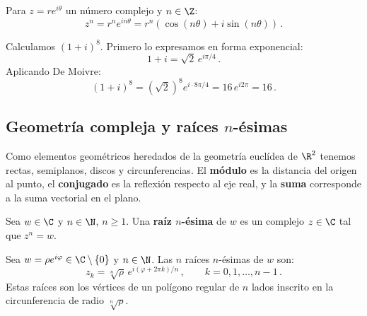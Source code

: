 \begin{theo}
  Para $z=re^{i\theta}$ un número complejo y $n \in \Z$:
  \begin{equation}
    \label{eq:formula-moivre}
    z^n = r^n e^{in\theta} = r^n(\cos(n\theta) + i\sin(n\theta))\,.
  \end{equation}
\end{theo}

\begin{eje}
  Calculamos $(1+i)^8$. Primero lo expresamos en forma exponencial:
  \[
    1+i = \sqrt{2}\,e^{i\pi/4}\,.
  \]
  Aplicando De Moivre:
  \[
    (1+i)^8 = \left(\sqrt{2}\right)^8 e^{i\cdot 8\pi/4} = 16\,e^{i2\pi} = 16\,.
  \]
\end{eje}

\subsection{Geometría compleja y raíces $n$-ésimas}

Como elementos geométricos heredados de la geometría euclídea de $\R^2$ tenemos rectas, semiplanos, discos y circunferencias. El \textbf{módulo} es la distancia del origen al punto, el \textbf{conjugado} es la reflexión respecto al eje real, y la \textbf{suma} corresponde a la suma vectorial en el plano.

\begin{defi}
  Sea $w\in\C$ y $n\in\N$, $n\geq 1$. Una \textbf{raíz $n$-ésima} de $w$ es un complejo $z\in\C$ tal que $z^n = w$.
\end{defi}

\begin{prop}
  Sea $w = \rho e^{i\varphi}\in\C\setminus\{0\}$ y $n\in\N$. Las $n$ raíces $n$-ésimas de $w$ son:
  \[
    z_k = \sqrt[n]{\rho}\,e^{i(\varphi + 2\pi k)/n}\,,\qquad k=0,1,\ldots,n-1\,.
  \]
  Estas raíces son los vértices de un polígono regular de $n$ lados inscrito en la circunferencia de radio $\sqrt[n]{\rho}$.
\end{prop}


